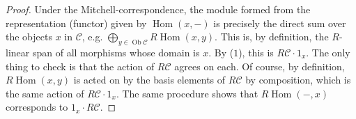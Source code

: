 \documentclass[reqno]{amsart}
\DeclareMathOperator{\Ob}{Ob}
\DeclareMathOperator{\Hom}{Hom}
\theoremstyle{definition}
\theoremstyle{remark}
\begin{document}
\begin{enumerate}
    \begin{proof}
      Under the Mitchell-correspondence, the module formed from the
      representation (functor) given by $\Hom(x, -)$ is precisely the direct sum
      over the objects $x$ in $\mathcal{C}$, e.g. $\bigoplus_{y \in
        \Ob{\mathcal{C}}} R \Hom(x, y)$. This is, by definition, the $R$-linear
      span of all morphisms whose domain is $x$. By ($1$), this is $R
      \mathcal{C} \cdot 1_x$. The only thing to check is that the action of
      $R\mathcal{C}$ agrees on each. Of course, by definition, $R\Hom(x, y)$ is
      acted on by the basis elements of $R\mathcal{C}$ by composition, which is
      the same action of $R \mathcal{C} \cdot 1_x$. The same procedure shows
      that $R \Hom(-, x)$ corresponds to $1_x \cdot R \mathcal{C}$.
    \end{proof}
\end{enumerate}
\end{document}

